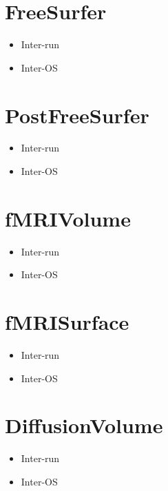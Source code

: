\section{FreeSurfer}
\begin{itemize}
    \item Inter-run
    \item Inter-OS
  \end{itemize}
  
\section{PostFreeSurfer}
\begin{itemize}
    \item Inter-run
    \item Inter-OS
  \end{itemize}
  
\section{fMRIVolume}
\begin{itemize}
    \item Inter-run
    \item Inter-OS
  \end{itemize}
  
\section{fMRISurface}
\begin{itemize}
    \item Inter-run
    \item Inter-OS
  \end{itemize}
  
\section{DiffusionVolume}
\begin{itemize}
    \item Inter-run
    \item Inter-OS
  \end{itemize}

